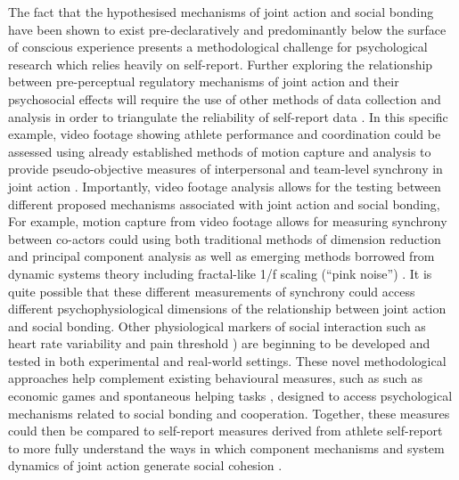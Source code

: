 \begin{CJK}{UTF8}{gbsn}
  The fact that the hypothesised mechanisms of joint action and social bonding have been shown to exist pre-declaratively and predominantly below the surface of conscious experience presents a methodological challenge for psychological research which relies heavily on self-report.  Further exploring the relationship between pre-perceptual regulatory mechanisms of joint action and their psychosocial effects will require the use of other methods of data collection and analysis in order to triangulate the reliability of self-report data \citep{Newell2014}.  In this specific example, video footage showing athlete performance and coordination could be assessed using already established methods of motion capture and analysis to provide pseudo-objective measures of interpersonal and team-level synchrony in joint action \citep[e.g.][]{Passos2011}.
  Importantly, video footage analysis allows for the testing between different proposed mechanisms associated with joint action and social bonding,  For example, motion capture from video footage allows for measuring synchrony between co-actors could using both traditional methods of dimension reduction and principal component analysis \citep[see for example][]{Riley2011} as well as emerging methods borrowed from dynamic systems theory including fractal-like 1/f scaling (``pink noise'') \citep[see for example][]{Holden2013}. It is quite possible that these different measurements of synchrony could access different psychophysiological dimensions of the relationship between joint action and social bonding.  Other physiological markers of social interaction such as heart rate variability \citep{Konvalinka2011,Fischer2014a} and pain threshold \citep{Cohen2009,Tarr2015}) are beginning to be developed and tested in both experimental and real-world settings.
  These novel methodological approaches help complement existing behavioural measures, such as such as economic games \citep{Xygalatas2013} and spontaneous helping tasks \citep{Kirschner2010}, designed to access psychological mechanisms related to social bonding and cooperation.
  Together, these measures could then be compared to self-report measures derived from athlete self-report to more fully understand the ways in which component mechanisms and system dynamics of joint action generate social cohesion \citep{Marsh2009}.


\end{CJK}
